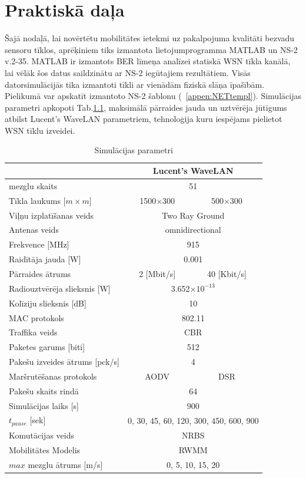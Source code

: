 \chapter{Praktiskā daļa}\label{sec:prakt}
Šajā nodaļā, lai novērtētu mobilitātes ietekmi uz pakalpojuma kvalitāti bezvadu sensoru tīklos, aprēķiniem tiks izmantota lietojumprogramma MATLAB un \ac{NS-2} v.2-35. MATLAB ir izmantots BER līmeņa analīzei statiskā WSN tīkla kanālā, lai vēlāk šos datus saildzinātu ar NS-2 iegūtajiem rezultātiem.
Visās datorsimulācijās tika izmantoti tīkli ar vienādām fiziskā slāņa īpašībām. Pielikumā var apskatīt izmantoto NS-2 šablonu (\seename~\ref{appen:NETtempl}). Simulācijas parametri apkopoti Tab.\ref{tab:param}, maksimālā pārraides jauda un uztvērēja jūtīgums atbilst Lucent’s WaveLAN parametriem, tehnoloģija kuru iespējams pielietot WSN tīklu izveidei.
\begin{table}[!htb]
\centering
 \begin{tabular}{|l|c|c|}
\hline
~&\multicolumn{2}{c|}{Lucent’s WaveLAN}\\
\hline\hline
mezglu skaits&\multicolumn{2}{c|}{51}\\\hline
Tīkla laukums [$m\times m$]&1500$\times$300&500$\times$300\\\hline
Viļņu izplatīšanas veids&\multicolumn{2}{c|}{Two Ray Ground}\\\hline
Antenas veids&\multicolumn{2}{c|}{omnidirectional}\\\hline
Frekvence [MHz]& \multicolumn{2}{c|}{915}\\\hline
Raidītāja jauda [W]&\multicolumn{2}{c|}{0.001}\\\hline
Pārraides ātrums &2 [Mbit/s]&40 [Kbit/s]\\\hline
Radiouztvērēja slieksnis [W]&\multicolumn{2}{c|}{3.652$\times10^{-13}$}\\\hline
Kolīziju slieksnis [dB]&\multicolumn{2}{c|}{10}\\\hline
MAC protokols& \multicolumn{2}{c|}{802.11}\\\hline
Traffika veids&\multicolumn{2}{c|}{CBR}\\\hline
Paketes garums [biti]&\multicolumn{2}{c|}{512}\\\hline
Pakešu izveides ātrums [pck/s]&\multicolumn{2}{c|}{4}\\\hline
Maršrutēšanas protokols&AODV&DSR\\\hline
Pakešu skaits rindā&\multicolumn{2}{c|}{64}\\\hline
Simulācijas laiks [s]&\multicolumn{2}{c|}{900}\\\hline
$t_{pause}$ [sek] &\multicolumn{2}{c|}{0, 30, 45, 60, 120, 300, 450, 600, 900}\\\hline
Komutācijas veids&\multicolumn{2}{c|}{NRBS}\\\hline
Mobilitātes Modelis&\multicolumn{2}{c|}{RWMM}\\\hline
$max$ mezglu ātrums [m/s]&\multicolumn{2}{c|}{0, 5, 10, 15, 20}\\
\hline
\end{tabular}
\caption{Simulācijas parametri}
\label{tab:param}
\end{table}

